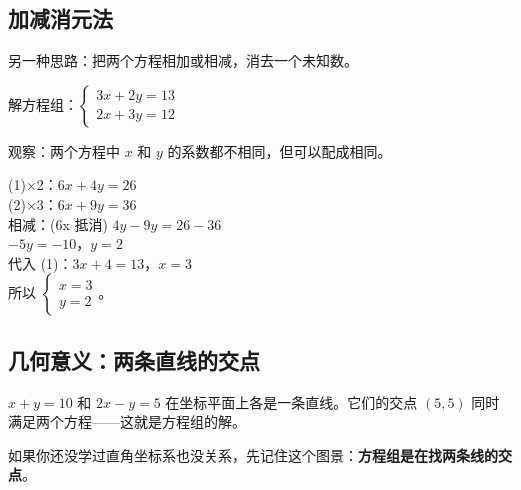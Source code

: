 \subsection*{加减消元法}

另一种思路：把两个方程相加或相减，消去一个未知数。

\begin{example}
解方程组：$\begin{cases}3x + 2y = 13\\2x + 3y = 12\end{cases}$
\end{example}
\begin{solution}
观察：两个方程中 $x$ 和 $y$ 的系数都不相同，但可以配成相同。

(1)×2：$6x + 4y = 26$\\
(2)×3：$6x + 9y = 36$\\
相减：(6x 抵消) $4y - 9y = 26 - 36$\\
$-5y = -10$，$y = 2$\\
代入 (1)：$3x + 4 = 13$，$x = 3$\\
所以 $\begin{cases}x=3\\y=2\end{cases}$。
\end{solution}

\subsection*{几何意义：两条直线的交点}

$x + y = 10$ 和 $2x - y = 5$ 在坐标平面上各是一条直线。它们的交点 $(5,5)$ 同时满足两个方程——这就是方程组的解。

如果你还没学过直角坐标系也没关系，先记住这个图景：\textbf{方程组是在找两条线的交点}。

